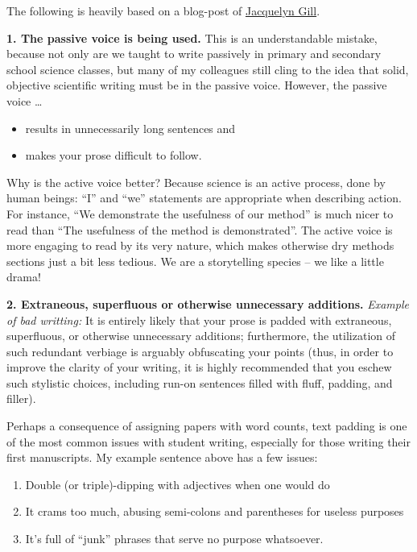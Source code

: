 \documentclass[
]{book}
\providecommand{\tightlist}{%
  \setlength{\itemsep}{0pt}\setlength{\parskip}{0pt}}
\begin{document}
The following is heavily based on a blog-post of \href{https://contemplativemammoth.com/2018/08/21/five-common-writing-mistakes-new-scientists-make/}{Jacquelyn Gill}.

\textbf{1. The passive voice is being used.}
This is an understandable mistake, because not only are we taught to write passively in primary and secondary school science classes, but many of my colleagues still cling to the idea that solid, objective scientific writing must be in the passive voice. However, the passive voice \ldots{}

\begin{itemize}
\tightlist
\item
  results in unnecessarily long sentences and\\
\item
  makes your prose difficult to follow.
\end{itemize}

Why is the active voice better? Because science is an active process, done by human beings: ``I'' and ``we'' statements are appropriate when describing action. For instance, ``We demonstrate the usefulness of our method'' is much nicer to read than ``The usefulness of the method is demonstrated''. The active voice is more engaging to read by its very nature, which makes otherwise dry methods sections just a bit less tedious. We are a storytelling species -- we like a little drama!

\hfill\break

\textbf{2. Extraneous, superfluous or otherwise unnecessary additions.}
\emph{Example of bad writting:} It is entirely likely that your prose is padded with extraneous, superfluous, or otherwise unnecessary additions; furthermore, the utilization of such redundant verbiage is arguably obfuscating your points (thus, in order to improve the clarity of your writing, it is highly recommended that you eschew such stylistic choices, including run-on sentences filled with fluff, padding, and filler).

Perhaps a consequence of assigning papers with word counts, text padding is one of the most common issues with student writing, especially for those writing their first manuscripts. My example sentence above has a few issues:

\begin{enumerate}
\def\labelenumi{\arabic{enumi}.}
\tightlist
\item
  Double (or triple)-dipping with adjectives when one would do
\item
  It crams too much, abusing semi-colons and parentheses for useless purposes
\item
  It's full of ``junk'' phrases that serve no purpose whatsoever.
\end{enumerate}
\end{document}
